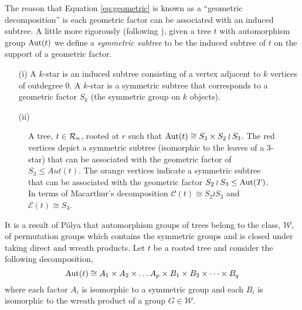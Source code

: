 The reason that Equation \ref{eq:geometric} is known as a ``geometric decomposition'' is each geometric factor can be associated 
with an induced subtree.   A little more rigorously (following \cite{macarthur}), given a tree $t$ with automorphism group 
$\operatorname{Aut}(t)$ we define a \emph{symmetric subtree} to be the induced subtree of $t$ on the support of a geometric factor.
\begin{ex}
\begin{itemize}
 \item[(i)]  A $k$-star is an induced subtree consisting of a vertex adjacent to $k$ vertices of outdegree 0.  A $k$-star is a symmetric subtree that corresponds to a geometric factor $S_k$ (the symmetric group on $k$ objects).  
 \item[(ii)] %
\end{itemize}
\begin{figure}[ht]
\centering
{}
\caption{A tree, $t \in \operatorname{\mathcal{R}}_n$,  rooted at $r$ such that $\operatorname{Aut}(t) \cong S_{3} \times S_{2}\wr S_{3}$.  
The red vertices depict a symmetric subtree (isomorphic to the leaves of a 3-star) that can be associated with the geometric factor  
of  $S_{3} \leq Aut(t)$. The orange vertices indicate a symmetric subtree that can be associated with the geometric factor $S_{2}\wr S_{3} \leq \operatorname{Aut}(T)$. 
In terms of Macarthur's decomposition $\mathcal{C}(t) \cong S_{2}\wr S_{3}$ and $\mathcal{E}(t) \cong{S_3}$.}
\end{figure}
\end{ex}
 It is a result of P\'{o}lya that automorphism 
groups of trees belong to the class, $\mathcal{W}$, of permutation groups which contains the symmetric groups and is closed under taking direct and wreath products.  Let $t$ 
be a rooted tree and consider the following decomposition,
\begin{equation}\label{eq:decomposition}
 \operatorname{Aut}(t) \cong A_1 \times A_2 \times \dots A_p \times B_1 \times B_2 \times \dots \times B_q  
\end{equation}
where each factor $A_i$ is isomorphic to a symmetric group and each $B_i$ is isomorphic to the wreath product of a group $G \in \mathcal{W}$.

